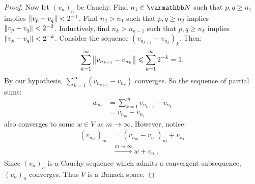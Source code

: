 \begin{proof}
            Now let $(v_n)_n$ be Cauchy. Find $n_1 \in \bfN$ such that $p,q \geq n_1$ implies $\left\lVert v_p - v_q \right\rVert < 2^{-1}$. Find $n_2 > n_1$ such that $p,q \geq n_2$ implies $\left\lVert v_p - v_q \right\rVert < 2^{-2}$. Inductively, find $n_k > n_{k-1}$ such that $p,q \geq n_k$ implies $\left\lVert v_p - v_q \right\rVert < 2^{-k}$. Consider the sequence $(v_{n_{k+1}} - v_{n_k})_k$. Then:
                \begin{equation*}
                \begin{split}
                    \sum_{k = 1}^\infty \left\lVert v_{n_{k+1}} - v_{n_k} \right\rVert \leqslant \sum_{k = 1}^\infty 2^{-k} = 1.
                \end{split}
                \end{equation*}
            By our hypothesis, $\sum_{k = 1}^\infty (v_{n_{k+1}} - v_{n_k})$ converges. So the sequence of partial sums:
                \begin{equation*}
                \begin{split}
                    w_m 
                    & = \sum_{k = 1}^m v_{n_{k+1}} - v_{n_k} \\
                    & = v_{n_m} - v_{n_1}
                \end{split}
                \end{equation*}
            also converges to some $w \in V$ as $m \rightarrow \infty$. However, notice:
                \begin{equation*}
                \begin{split}
                    (v_{n_m})_m 
                    & = (v_{n_m} - v_{n_1})_m + v_{n_1} \\
                    & \xrightarrow{m \rightarrow \infty} w + v_{n_1}.
                \end{split}
                \end{equation*}
            Since $(v_n)_n$ is a Cauchy sequence which admits a convergent subsequence, $(v_n)_n$ converges. Thus $V$ is a Banach space.
        \end{proof}

